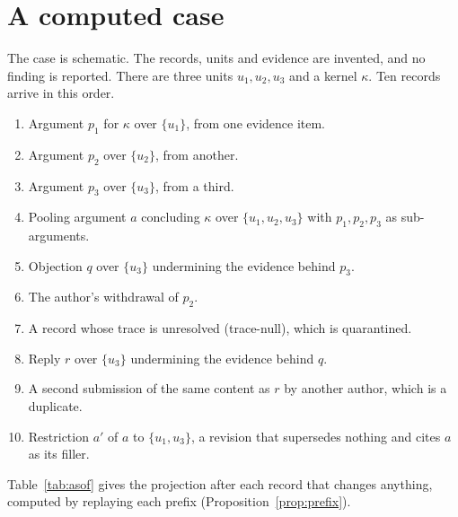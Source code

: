 \documentclass[11pt]{article}
\theoremstyle{plain}
\theoremstyle{definition}
\theoremstyle{remark}
\begin{document}
\section{A computed case}\label{sec:case}

The case is schematic. The records, units and evidence are invented, and no finding is reported. There are three units $u_1,u_2,u_3$ and a kernel $\kappa$. Ten records arrive in this order.
\begin{enumerate}[nosep,label=$r_{\arabic*}$.]
\item Argument $p_1$ for $\kappa$ over $\{u_1\}$, from one evidence item.
\item Argument $p_2$ over $\{u_2\}$, from another.
\item Argument $p_3$ over $\{u_3\}$, from a third.
\item Pooling argument $a$ concluding $\kappa$ over $\{u_1,u_2,u_3\}$ with $p_1,p_2,p_3$ as sub-arguments.
\item Objection $q$ over $\{u_3\}$ undermining the evidence behind $p_3$.
\item The author's withdrawal of $p_2$.
\item A record whose trace is unresolved (trace-null), which is quarantined.
\item Reply $r$ over $\{u_3\}$ undermining the evidence behind $q$.
\item A second submission of the same content as $r$ by another author, which is a duplicate.
\item Restriction $a'$ of $a$ to $\{u_1,u_3\}$, a revision that supersedes nothing and cites $a$ as its filler.
\end{enumerate}
Table~\ref{tab:asof} gives the projection after each record that changes anything, computed by replaying each prefix (Proposition~\ref{prop:prefix}).
\end{document}
